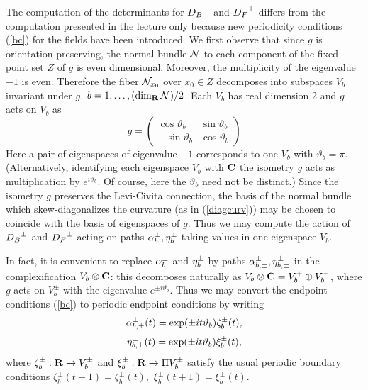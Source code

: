 \documentclass[12pt]{article}
\begin{document}
\newcommand{\eig}{\vartheta}

The computation of the determinants for ${D_B}^\perp$ and
${D_F}^\perp$ differs from the computation presented in the lecture
only because new  periodicity conditions (\ref{bc}) for the fields  have
been introduced. 
We first observe that since $g$ is orientation preserving,
the normal bundle ${\cal N}$ to each component
of the fixed point set $Z$ of $g$ is even dimensional.
Moreover, the multiplicity of the eigenvalue $-1$ is even.
Therefore the fiber ${\cal N}_{x_0}$ over $x_0\in Z$ decomposes into
subspaces $V_b$ invariant under $g$, $b = 1,\dots,(\dim_{\mathbf{R}}{\cal N})/2$.
Each $V_b$ has real dimension 2 and $g$ acts on $V_b$ as
\begin{equation}
g = \left (\begin{array}{lr} \cos \eig_b & \sin \eig_b \\
       - \sin \eig_b & \cos \eig_b \end{array} \right )
\end{equation}
Here a pair of eigenspaces of eigenvalue $-1$ corresponds to one $V_b$
with $\eig_b=\pi$.
(Alternatively, identifying each eigenspace 
$V_b$ with ${\mathbf{C}}$ the isometry  $g$ acts as multiplication by 
$e^{i \eig_b}$. Of course, here the $\eig_b$ need not be distinct.)
Since the isometry $g$ preserves the Levi-Civita connection,
the basis of the normal bundle which skew-diagonalizes the curvature
(as in (\ref{diagcurv}))
may be chosen to coincide with the basis of eigenspaces of $g$.
Thus we may compute the action of 
${D_B}^\perp$ and ${D_F}^\perp$  acting on paths 
${ {\alpha }}^{\perp}_b, { \eta}^{\perp}_b$ taking
values in one eigenspace $V_b$. 


In fact, it is convenient to  replace ${ {\alpha }}^{\perp}_b$ 
and ${ \eta}^{\perp}_b$ by  paths ${ {\alpha }}^{\perp}_{b,\pm}, { \eta}^{\perp}_{b,\pm}$ in the 
complexification $V_b \otimes {\mathbf{C}}$: this decomposes naturally 
as $V_b \otimes {\mathbf{C}} = V_b^+ \oplus V_b^-$, where
$g$ acts on $V_b^\pm$ with the eigenvalue $e^{\pm i \eig_b}$.
Thus we 
may convert the endpoint conditions (\ref{bc}) to periodic endpoint
conditions by writing
\begin{equation} \label{transbose}
 \bosen_{b,\pm} (t) = \exp (\pm i t \eig_b) \zeta^\pm_b(t), 
\end{equation}
\begin{equation} \label{transferm}
 \etan_{b,\pm} (t) = \exp (\pm i t \eig_b) \xi^\pm_b(t), 
\end{equation}
where $\zeta^\pm_b: {\mathbf{R}} \to V_b^\pm$ and
$\xi^\pm_b: {\mathbf{R}} \to \Pi V_b^\pm$ satisfy the usual periodic
boundary conditions
$\zeta^\pm_b(t+1) = \zeta^\pm_b(t), $
$\xi^\pm_b(t+1) = \xi^\pm_b(t). $
\end{document}
